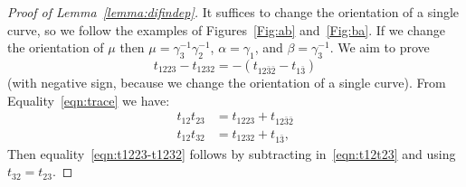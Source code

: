 \documentclass[11pt]{article}
\theoremstyle{definition}
\numberwithin{equation}{section}
\numberwithin{figure}{section}
\numberwithin{table}{section}
\begin{document}
\begin{proof}[Proof of Lemma~\ref{lemma:difindep}]
It suffices to change the orientation of a single curve, so we follow the examples of Figures~\ref{Fig:ab} and~\ref{Fig:ba}. If we change the orientation of $\mu$ then $\mu=\gamma_3^{-1}\gamma_2^{-1}$, $\alpha= \gamma_1$, and $\beta= \gamma_3^{-1}$. We aim to prove
\begin{equation}\label{eqn:t1223-t1232}
t_{1223}-t_{1232}= - (t_{12\bar3\bar2}-t_{1\bar 3})
\end{equation}
(with negative sign, because we change the orientation of a single curve). From Equality~\eqref{eqn:trace} we have:
\begin{equation}\label{eqn:t12t23}
\begin{aligned}
t_{12}t_{23} & = t_{1223}+t_{12\bar3\bar2} \\
t_{12}t_{32} & = t_{1232}+ t_{1\bar 3},
\end{aligned}
\end{equation}
Then equality~\eqref{eqn:t1223-t1232} follows by subtracting in~\eqref{eqn:t12t23} and using $t_{32}=t_{23}$.
\end{proof}
\end{document}

